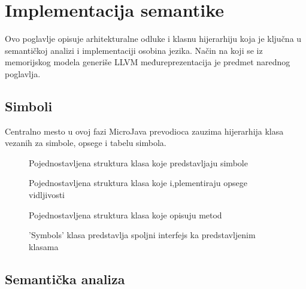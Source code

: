\chapter{Implementacija semantike}

Ovo poglavlje opisuje arhitekturalne odluke i klasnu hijerarhiju koja je ključna u semantičkoj analizi i implementaciji osobina jezika.
Način na koji se iz memorijskog modela generiše LLVM međureprezentacija je predmet narednog poglavlja.


\section{Simboli}

Centralno mesto u ovoj fazi MicroJava prevodioca zauzima hijerarhija klasa vezanih za simbole, opsege i tabelu simbola.

\begin{figure}[h]

	\centering
	
	\caption{Pojednostavljena struktura klasa koje predstavljaju simbole}
\end{figure}


\begin{figure}[h]

	\centering
	
	\caption{Pojednostavljena struktura klasa koje i,plementiraju opsege vidljivosti}
\end{figure}

\begin{figure}[h]

	\centering
	
	\caption{Pojednostavljena struktura klasa koje opisuju metod}
\end{figure}

\begin{figure}[h]

	\centering
	
	\caption{'Symbols' klasa predstavlja spoljni interfejs ka predstavljenim klasama}
\end{figure}

\section{Semantička analiza}


